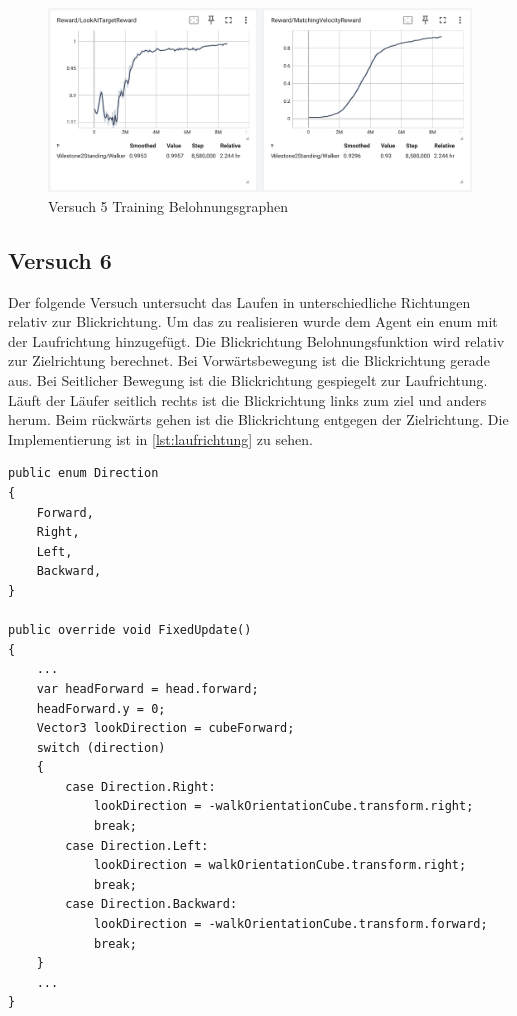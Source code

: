 \begin{figure}[H]
  \centering  
  \includegraphics[scale=0.5]{img/versuch5_training_belohnung.png}
  \caption{Versuch 5 Training Belohnungsgraphen}
  \label{fig:versuch5_training_belohnung}
\end{figure}

\subsection{Versuch 6}
Der folgende Versuch untersucht das Laufen in unterschiedliche Richtungen relativ zur Blickrichtung. Um das zu realisieren wurde dem Agent ein enum mit der Laufrichtung hinzugefügt. Die Blickrichtung Belohnungsfunktion wird relativ zur Zielrichtung berechnet. Bei Vorwärtsbewegung ist die Blickrichtung gerade aus. Bei Seitlicher Bewegung ist die Blickrichtung gespiegelt zur Laufrichtung. Läuft der Läufer seitlich rechts ist die Blickrichtung links zum ziel und anders herum. Beim rückwärts gehen ist die Blickrichtung entgegen der Zielrichtung. Die Implementierung ist in \ref{lst:laufrichtung} zu sehen.

\begin{lstlisting}[caption={Laufrichtung Enum, Beobachtung und Belohnung},captionpos=b,label={lst:laufrichtung}]
public enum Direction
{
    Forward,
    Right,
    Left,
    Backward,
}
    
public override void FixedUpdate()
{
    ...
    var headForward = head.forward;
    headForward.y = 0;
    Vector3 lookDirection = cubeForward;
    switch (direction)
    {
        case Direction.Right:
            lookDirection = -walkOrientationCube.transform.right;
            break;
        case Direction.Left:
            lookDirection = walkOrientationCube.transform.right;
            break;
        case Direction.Backward:
            lookDirection = -walkOrientationCube.transform.forward;
            break;
    }
    ...
}
\end{lstlisting}

